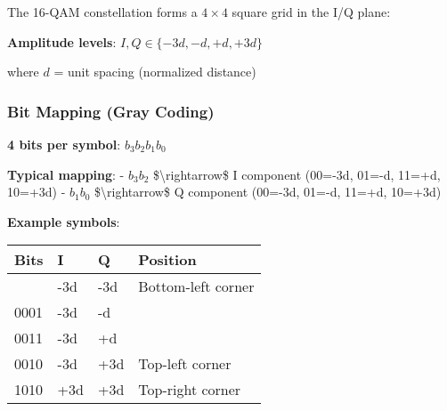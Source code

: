 The 16-QAM constellation forms a $4 \times 4$ square grid in the I/Q plane:

\begin{center}
\end{center}

\textbf{Amplitude levels}: $I, Q \in \{-3d, -d, +d, +3d\}$

where $d$ = unit spacing (normalized distance)

\subsubsection{Bit Mapping (Gray Coding)}\label{bit-mapping-gray-coding}

\textbf{4 bits per symbol}: \(b_3 b_2 b_1 b_0\)

\textbf{Typical mapping}: - \(b_3 b_2\) \$\textbackslash rightarrow\$ I
component (00=-3d, 01=-d, 11=+d, 10=+3d) - \(b_1 b_0\)
\$\textbackslash rightarrow\$ Q component (00=-3d, 01=-d, 11=+d, 10=+3d)

\textbf{Example symbols}:

{\def\LTcaptype{} %
\begin{longtable}[]{@{}llll@{}}
\toprule\noalign{}
Bits & I & Q & Position \\
\midrule\noalign{}
\endhead
\bottomrule\noalign{}
\endlastfoot
0000 & -3d & -3d & Bottom-left corner \\
0001 & -3d & -d & \\
0011 & -3d & +d & \\
0010 & -3d & +3d & Top-left corner \\
1010 & +3d & +3d & Top-right corner \\
\end{longtable}
}

